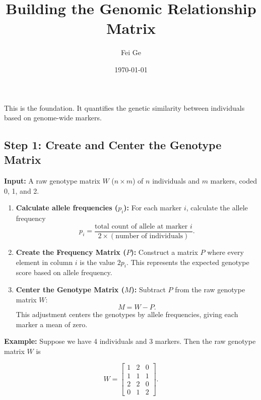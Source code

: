 \documentclass[12pt]{article}
\title{\textbf{Building the Genomic Relationship Matrix}}
\author{Fei Ge}
\date{\today}
\begin{document}
\maketitle

\noindent This is the foundation. It quantifies the genetic similarity
between individuals based on genome-wide markers.

\vspace{1em}

\subsection*{Step 1: Create and Center the Genotype Matrix}

\textbf{Input:} A raw genotype matrix $W$ ($n \times m$) of $n$ individuals and $m$ markers,
coded 0, 1, and 2.

\bigskip

\begin{enumerate}
    \item \textbf{Calculate allele frequencies ($p_i$):}
    For each marker $i$, calculate the allele frequency
    \[
    p_i = \frac{\text{total count of allele at marker } i}{2 \times (\text{number of individuals})}.
    \]

    \item \textbf{Create the Frequency Matrix ($P$):}
    Construct a matrix $P$ where every element in column $i$ is the value $2p_i$.
    This represents the expected genotype score based on allele frequency.

    \item \textbf{Center the Genotype Matrix ($M$):}
    Subtract $P$ from the raw genotype matrix $W$:
    \[
    M = W - P.
    \]
    This adjustment centers the genotypes by allele frequencies, giving each marker a mean of zero.
\end{enumerate}

\textbf{Example:} Suppose we have 4 individuals and 3 markers.
Then the raw genotype matrix $W$ is

\[
W =
\begin{bmatrix}
1 & 2 & 0 \\
1 & 1 & 1 \\
2 & 2 & 0 \\
0 & 1 & 2
\end{bmatrix}.
\]
\end{document}
